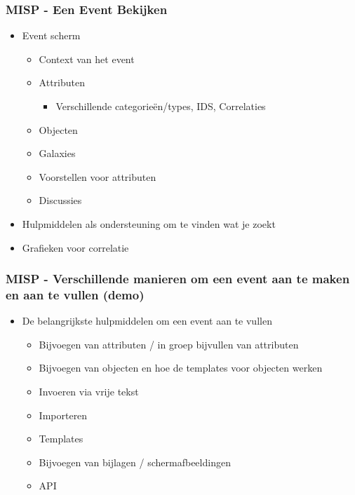 \begin{frame}
    \frametitle{MISP - Een Event Bekijken}
    \begin{itemize}
     \item Event scherm
        \begin{itemize}
            \item Context van het event
            \item Attributen
            \begin{itemize}
                \item Verschillende categorieën/types, IDS, Correlaties
            \end{itemize}
            \item Objecten
            \item Galaxies
            \item Voorstellen voor attributen
            \item Discussies
        \end{itemize}
    \item Hulpmiddelen als ondersteuning om te vinden wat je zoekt
    \item Grafieken voor correlatie
    \end{itemize}
\end{frame}

\begin{frame}
    \frametitle{MISP - Verschillende manieren om een event aan te maken en aan te vullen (demo)}
    \begin{itemize}
    \item De belangrijkste hulpmiddelen om een event aan te vullen
        \begin{itemize}
            \item Bijvoegen van attributen / in groep bijvullen van attributen
            \item Bijvoegen van objecten en hoe de templates voor objecten werken
            \item Invoeren via vrije tekst
            \item Importeren
            \item Templates
            \item Bijvoegen van bijlagen / schermafbeeldingen
            \item API
        \end{itemize}
    \end{itemize}
\end{frame}

